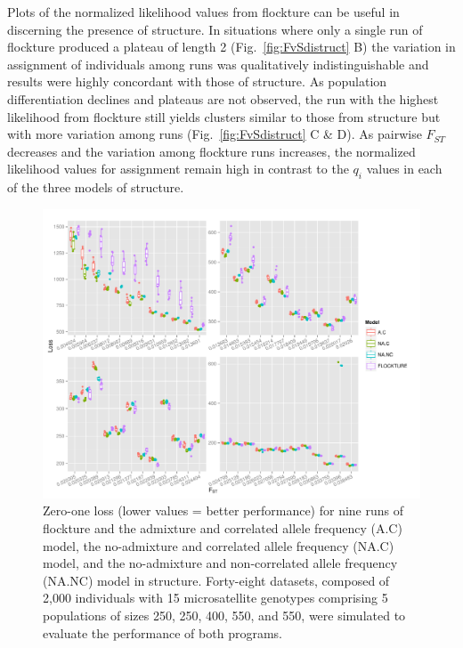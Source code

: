 Plots of the normalized likelihood values from {\sc flockture} can be useful in discerning the presence of 
structure.  In situations where only a single run of {\sc flockture} produced a plateau of length 2 
(Fig.~\ref{fig:FvSdistruct} B) the variation in assignment of individuals among runs was qualitatively indistinguishable
and results were highly concordant with those of {\sc structure}. As population differentiation declines 
and plateaus are not observed, the run with the highest likelihood from {\sc flockture} still yields
clusters similar to those from {\sc structure} but with more variation among runs (Fig.~\ref{fig:FvSdistruct} C \& D).
As pairwise $F_{ST}$ decreases and the variation among {\sc flockture} runs increases, the normalized likelihood
values for assignment remain high in contrast to the $q_i$ values in each of the three models of {\sc structure}. 

  \begin{figure}
\centering
\includegraphics[width=.9\linewidth]{images/Figures-Pat/uSatLoss.pdf}%
  \caption{Zero-one loss (lower values = better performance) for nine runs of {\sc flockture} and the admixture and correlated allele 
  frequency (A.C) model, the no-admixture and correlated allele frequency (NA.C) model, 
and the no-admixture and non-correlated allele frequency (NA.NC) model in {\sc structure}. Forty-eight 
datasets, composed of 2,000 individuals with 15 microsatellite genotypes comprising
5 populations of sizes 250, 250, 400, 550, and 550, were simulated to evaluate the performance
of both programs. }
  \label{fig:uSatLoss}
\end{figure} 

